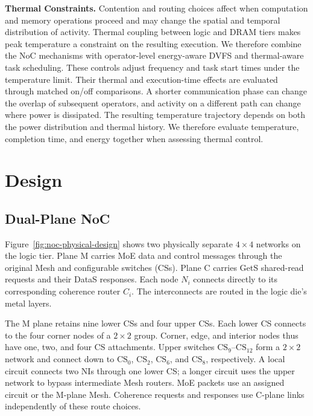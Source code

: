 \documentclass[conference,10pt]{IEEEtran}
\begin{document}
\noindent\textbf{Thermal Constraints.}
Contention and routing choices affect when computation and memory
operations proceed and may change the spatial and temporal distribution
of activity. Thermal coupling between logic and DRAM tiers makes peak
temperature a constraint on the resulting execution. We therefore combine
the NoC mechanisms with operator-level energy-aware DVFS and thermal-aware
task scheduling. These controls adjust frequency and task start times
under the temperature limit. Their thermal and execution-time effects are
evaluated through matched on/off comparisons.
A shorter communication phase can change the overlap of subsequent
operators, and activity on a different path can change where power is
dissipated. The resulting temperature trajectory depends on both the
power distribution and thermal history. We therefore evaluate temperature,
completion time, and energy together when assessing thermal control.

\section{Design}
\label{sec:design}

\subsection{Dual-Plane NoC}
\label{sec:noc-design}

Figure~\ref{fig:noc-physical-design} shows two physically separate
$4\times4$ networks on the logic tier. Plane M carries MoE data and
control messages through the original Mesh and configurable switches
(CSs). Plane C carries GetS shared-read requests and their DataS
responses. Each node $N_i$ connects directly to its corresponding
coherence router $C_i$. The interconnects are routed in the logic die's
metal layers.

The M plane retains nine lower CSs and four upper CSs. Each lower CS
connects to the four corner nodes of a $2\times2$ group. Corner, edge,
and interior nodes thus have one, two, and four CS attachments.
Upper switches $\mathrm{CS}_9$--$\mathrm{CS}_{12}$ form a $2\times2$
network and connect down to $\mathrm{CS}_0$, $\mathrm{CS}_2$,
$\mathrm{CS}_6$, and $\mathrm{CS}_8$, respectively. A local circuit
connects two NIs through one lower CS; a longer circuit uses the upper
network to bypass intermediate Mesh routers. MoE packets use an
assigned circuit or the M-plane Mesh. Coherence requests and responses
use C-plane links independently of these route choices.
\end{document}
